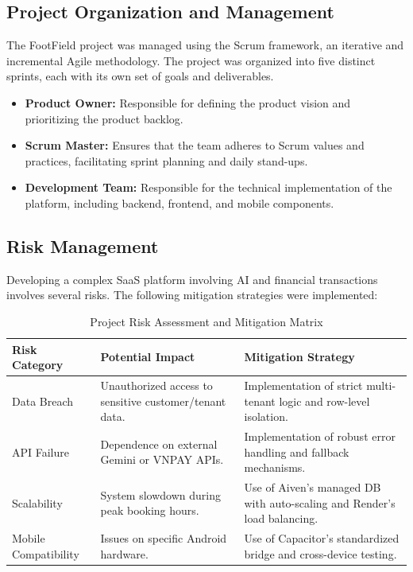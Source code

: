 \subsection{Project Organization and Management}
The FootField project was managed using the Scrum framework, an iterative and incremental Agile methodology. The project was organized into five distinct sprints, each with its own set of goals and deliverables.

\begin{itemize}
    \item \textbf{Product Owner:} Responsible for defining the product vision and prioritizing the product backlog.
    \item \textbf{Scrum Master:} Ensures that the team adheres to Scrum values and practices, facilitating sprint planning and daily stand-ups.
    \item \textbf{Development Team:} Responsible for the technical implementation of the platform, including backend, frontend, and mobile components.
\end{itemize}

\subsection{Risk Management}
Developing a complex SaaS platform involving AI and financial transactions involves several risks. The following mitigation strategies were implemented:

\begin{table}[htbp]
\centering
\begin{tabularx}{\textwidth}{|l|X|X|}
\hline
\rowcolor{LightCyan}
\textbf{Risk Category} & \textbf{Potential Impact} & \textbf{Mitigation Strategy} \\ \hline
Data Breach & Unauthorized access to sensitive customer/tenant data. & Implementation of strict multi-tenant logic and row-level isolation. \\ \hline
API Failure & Dependence on external Gemini or VNPAY APIs. & Implementation of robust error handling and fallback mechanisms. \\ \hline
Scalability & System slowdown during peak booking hours. & Use of Aiven's managed DB with auto-scaling and Render's load balancing. \\ \hline
Mobile Compatibility & Issues on specific Android hardware. & Use of Capacitor's standardized bridge and cross-device testing. \\ \hline
\end{tabularx}
\caption{Project Risk Assessment and Mitigation Matrix}
\end{table}
